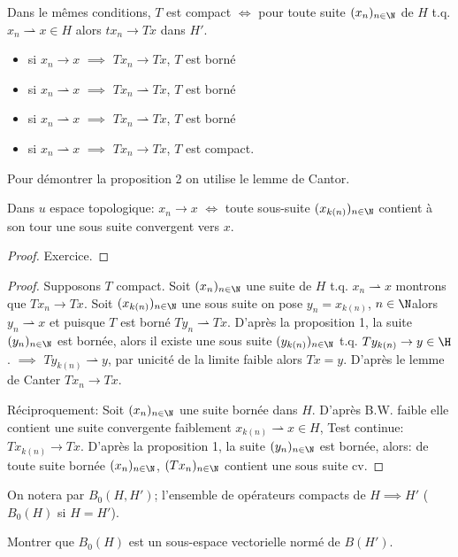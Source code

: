 \begin{proposition}
	Dans le mêmes conditions, $T$ est compact $\iff$ pour toute suite $(x_n)_{n\in \N}$ de $H$ t.q. $x_n\rightharpoonup x\in H$ alors $tx_n\to Tx$ dans $H'$.
\end{proposition}
\begin{remark}
	\begin{itemize}
	\leavevmode
		\item si $x_n\to x$ $\implies$ $Tx_n\to Tx$, $T$ est borné
		\item si $x_n\rightharpoonup x$ $\implies$ $Tx_n\rightharpoonup Tx$, $T$ est borné
		\item si $x_n\rightharpoonup x$ $\implies$ $Tx_n\rightharpoonup Tx$, $T$ est borné
		\item si $x_n\rightharpoonup x$ $\implies$ $Tx_n\to Tx$, $T$ est compact.
	\end{itemize}
\end{remark}
Pour démontrer la proposition 2 on utilise le lemme de Cantor.
\begin{lemme}
	Dans $u$ espace topologique: $x_n\to x$ $\iff$ toute sous-suite $(x_{k(n)})_{n\in\N}$ contient à son tour une sous suite convergent vers $x$.
\end{lemme}
\begin{proof}
	Exercice.
\end{proof}
\begin{proof}
	Supposons $T$ compact. Soit $(x_n)_{n\in\N}$ une suite de $H$ t.q. $x_n\rightharpoonup x$ montrons que $Tx_n\to Tx$. Soit $(x_{k(n)})_{n\in\N}$ une sous suite on pose $y_n=x_{k(n)}$, $n\in\N $alors $y_n\rightharpoonup x$ et puisque $T$ est borné $Ty_n\rightharpoonup Tx$. D'après la proposition 1, la suite $(y_n)_{n\in\N}$ est bornée, alors il existe une sous suite $(y_{k(n)})_{n\in\N}$ t.q. $Ty_{k(n)}\to y\in\H$. $\implies$ $Ty_{k(n)}\rightharpoonup y$, par unicité de la limite faible alors $Tx=y$. D'après le lemme de Canter $Tx_n\to Tx$.
	
	Réciproquement: Soit $(x_n)_{n\in\N}$ une suite bornée dans $H$. D'après B.W. faible elle contient une suite convergente faiblement $x_{k(n)}\rightharpoonup x\in H$, Test continue: $Tx_{k(n)}\to Tx$. D'après la proposition 1, la suite $(y_n)_{n\in\N}$ est bornée, alors: de toute suite bornée $(x_n)_{n\in\N}$, $(Tx_n)_{n\in\N}$ contient une sous suite cv.
\end{proof}

	On notera par $B_0(H,H')$; l'ensemble de opérateurs compacts de $H\implies H'$ ($B_0(H)$ si $H=H'$).
	\begin{exercise}
		Montrer que $B_0(H)$ est un sous-espace vectorielle normé de $B(H')$.
	\end{exercise}


